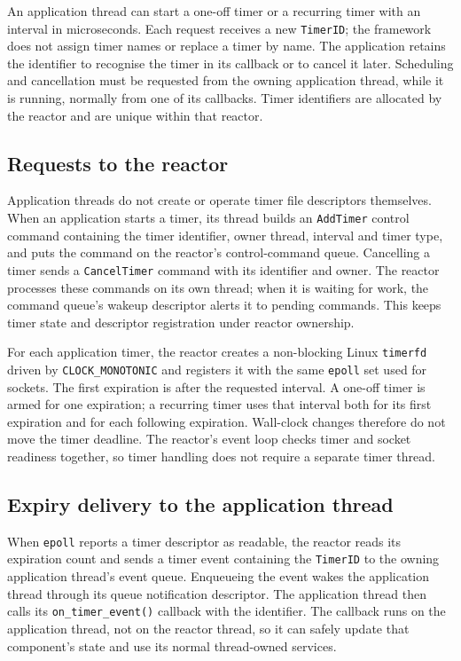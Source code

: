 An application thread can start a one-off timer or a recurring timer with an
interval in microseconds. Each request receives a new \texttt{TimerID}; the
framework does not assign timer names or replace a timer by name. The
application retains the identifier to recognise the timer in its callback or
to cancel it later. Scheduling and cancellation must be requested from the
owning application thread, while it is running, normally from one of its
callbacks. Timer identifiers are allocated by the reactor and are unique
within that reactor.

\subsection{Requests to the reactor}

Application threads do not create or operate timer file descriptors
themselves. When an application starts a timer, its thread builds an
\texttt{AddTimer} control command containing the timer identifier, owner thread,
interval and timer type, and puts the command on the reactor's control-command
queue. Cancelling a timer sends a \texttt{CancelTimer} command with its
identifier and owner. The reactor processes these commands on its own thread;
when it is waiting for work, the command queue's wakeup descriptor alerts it
to pending commands. This keeps timer state and descriptor registration under
reactor ownership.

For each application timer, the reactor creates a non-blocking Linux
\texttt{timerfd} driven by \texttt{CLOCK\_MONOTONIC} and registers it with the
same \texttt{epoll} set used for sockets. The first expiration is after the
requested interval. A one-off timer is armed for one expiration; a recurring
timer uses that interval both for its first expiration and for each following
expiration. Wall-clock changes therefore do not move the timer deadline. The
reactor's event loop checks timer and socket readiness together, so timer
handling does not require a separate timer thread.

\subsection{Expiry delivery to the application thread}

When \texttt{epoll} reports a timer descriptor as readable, the reactor reads
its expiration count and sends a timer event containing the \texttt{TimerID}
to the owning application thread's event queue. Enqueueing the event wakes the
application thread through its queue notification descriptor. The application
thread then calls its \texttt{on\_timer\_event()} callback with the identifier.
The callback runs on the application thread, not on the reactor thread, so it
can safely update that component's state and use its normal thread-owned
services.

